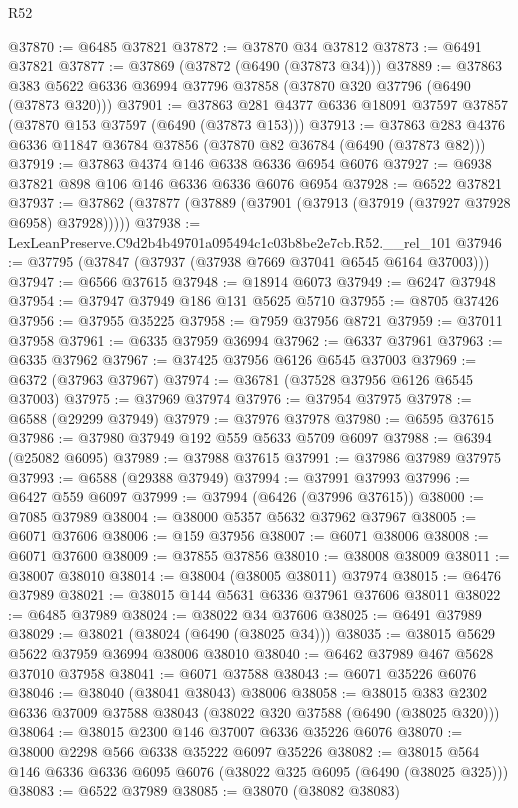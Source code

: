 \begin{lexlean}{R52}
\begin{coremodule}
@37870 := @6485 @37821
@37872 := @37870 @34 @37812
@37873 := @6491 @37821
@37877 := @37869 (@37872 (@6490 (@37873 @34)))
@37889 := @37863 @383 @5622 @6336 @36994 @37796 @37858 (@37870 @320 @37796 (@6490 (@37873 @320)))
@37901 := @37863 @281 @4377 @6336 @18091 @37597 @37857 (@37870 @153 @37597 (@6490 (@37873 @153)))
@37913 := @37863 @283 @4376 @6336 @11847 @36784 @37856 (@37870 @82 @36784 (@6490 (@37873 @82)))
@37919 := @37863 @4374 @146 @6338 @6336 @6954 @6076
@37927 := @6938 @37821 @898 @106 @146 @6336 @6336 @6076 @6954
@37928 := @6522 @37821
@37937 := @37862 (@37877 (@37889 (@37901 (@37913 (@37919 (@37927 @37928 @6958) @37928)))))
@37938 := LexLeanPreserve.C9d2b4b49701a095494c1c03b8be2e7cb.R52.__rel_101
@37946 := @37795 (@37847 (@37937 (@37938 @7669 @37041 @6545 @6164 @37003)))
@37947 := @6566 @37615
@37948 := @18914 @6073
@37949 := @6247 @37948
@37954 := @37947 @37949 @186 @131 @5625 @5710
@37955 := @8705 @37426
@37956 := @37955 @35225
@37958 := @7959 @37956 @8721
@37959 := @37011 @37958
@37961 := @6335 @37959 @36994
@37962 := @6337 @37961
@37963 := @6335 @37962
@37967 := @37425 @37956 @6126 @6545 @37003
@37969 := @6372 (@37963 @37967)
@37974 := @36781 (@37528 @37956 @6126 @6545 @37003)
@37975 := @37969 @37974
@37976 := @37954 @37975
@37978 := @6588 (@29299 @37949)
@37979 := @37976 @37978
@37980 := @6595 @37615
@37986 := @37980 @37949 @192 @559 @5633 @5709 @6097
@37988 := @6394 (@25082 @6095)
@37989 := @37988 @37615
@37991 := @37986 @37989 @37975
@37993 := @6588 (@29388 @37949)
@37994 := @37991 @37993
@37996 := @6427 @559 @6097
@37999 := @37994 (@6426 (@37996 @37615))
@38000 := @7085 @37989
@38004 := @38000 @5357 @5632 @37962 @37967
@38005 := @6071 @37606
@38006 := @159 @37956
@38007 := @6071 @38006
@38008 := @6071 @37600
@38009 := @37855 @37856
@38010 := @38008 @38009
@38011 := @38007 @38010
@38014 := @38004 (@38005 @38011) @37974
@38015 := @6476 @37989
@38021 := @38015 @144 @5631 @6336 @37961 @37606 @38011
@38022 := @6485 @37989
@38024 := @38022 @34 @37606
@38025 := @6491 @37989
@38029 := @38021 (@38024 (@6490 (@38025 @34)))
@38035 := @38015 @5629 @5622 @37959 @36994 @38006 @38010
@38040 := @6462 @37989 @467 @5628 @37010 @37958
@38041 := @6071 @37588
@38043 := @6071 @35226 @6076
@38046 := @38040 (@38041 @38043) @38006
@38058 := @38015 @383 @2302 @6336 @37009 @37588 @38043 (@38022 @320 @37588 (@6490 (@38025 @320)))
@38064 := @38015 @2300 @146 @37007 @6336 @35226 @6076
@38070 := @38000 @2298 @566 @6338 @35222 @6097 @35226
@38082 := @38015 @564 @146 @6336 @6336 @6095 @6076 (@38022 @325 @6095 (@6490 (@38025 @325)))
@38083 := @6522 @37989
@38085 := @38070 (@38082 @38083)

\end{coremodule}
\end{lexlean}
